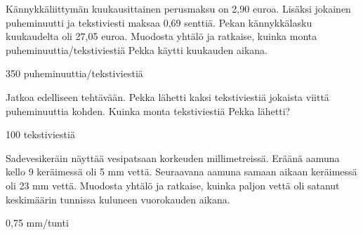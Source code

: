 \begin{tehtava}
Kännykkäliittymän kuukausittainen perusmaksu on 2,90 euroa. Lisäksi jokainen puheminuutti ja tekstiviesti maksaa 0,69 senttiä. Pekan kännykkälasku kuukaudelta oli 27,05 euroa. Muodosta yhtälö ja ratkaise, kuinka monta puheminuuttia/tekstiviestiä Pekka käytti kuukauden aikana.

	\begin{vastaus}
	350 puheminuuttia/tekstiviestiä
	\end{vastaus}
\end{tehtava}

\begin{tehtava}
Jatkoa edelliseen tehtävään. Pekka lähetti kaksi tekstiviestiä jokaista viittä puheminuuttia kohden. Kuinka monta tekstiviestiä Pekka lähetti?
	\begin{vastaus}
	100 tekstiviestiä
	\end{vastaus}
\end{tehtava}

\begin{tehtava}
Sadevesikeräin näyttää vesipatsaan korkeuden millimetreissä. Eräänä aamuna kello 9 keräimessä oli 5 mm vettä. Seuraavana aamuna samaan aikaan keräimessä oli 23 mm vettä. Muodosta yhtälö ja ratkaise, kuinka paljon vettä oli satanut keskimäärin tunnissa kuluneen vuorokauden aikana.
	\begin{vastaus}
	0,75 mm/tunti
	\end{vastaus}
\end{tehtava}